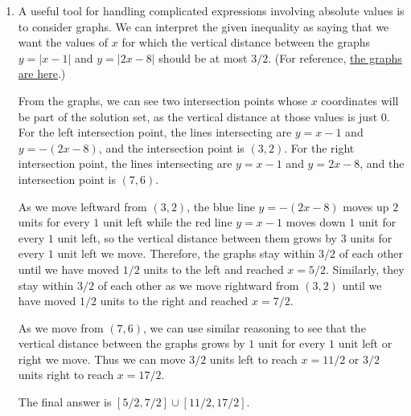 \begin{enumerate}
\item A useful tool for handling complicated expressions involving absolute values is to consider graphs. We can interpret the given inequality as saying that we want the values of $x$ for which the vertical distance between the graphs $y = \lvert x - 1\rvert$ and $y = \lvert 2x - 8\rvert$ should be at most $3/2$. (For reference, \href{https://www.desmos.com/calculator/wowoxwrkea}{the graphs are here}.)\par 
From the graphs, we can see two intersection points whose $x$ coordinates will be part of the solution set, as the vertical distance at those values is just $0$. For the left intersection point, the lines intersecting are $y = x - 1$ and $y = -(2x - 8)$, and the intersection point is $(3,2)$. For the right intersection point, the lines intersecting are $y = x - 1$ and $y = 2x - 8$, and the intersection point is $(7,6)$.\par
As we move leftward from $(3,2)$, the blue line $y = -(2x - 8)$ moves up $2$ units for every $1$ unit left while the red line $y = x - 1$ moves down $1$ unit for every $1$ unit left, so the vertical distance between them grows by $3$ units for every $1$ unit left we move. Therefore, the graphs stay within $3/2$ of each other until we have moved $1/2$ units to the left and reached $x = 5/2$. Similarly, they stay within $3/2$ of each other as we move rightward from $(3,2)$ until we have moved $1/2$ units to the right and reached $x = 7/2$.\par
As we move from $(7,6)$, we can use similar reasoning to see that the vertical distance between the graphs grows by $1$ unit for every $1$ unit left or right we move. Thus we can move $3/2$ units left to reach $x = 11/2$ or $3/2$ units right to reach $x = 17/2$.\par 
The final answer is $\boxed{[5/2,7/2]\cup [11/2,17/2]}$.
\end{enumerate}